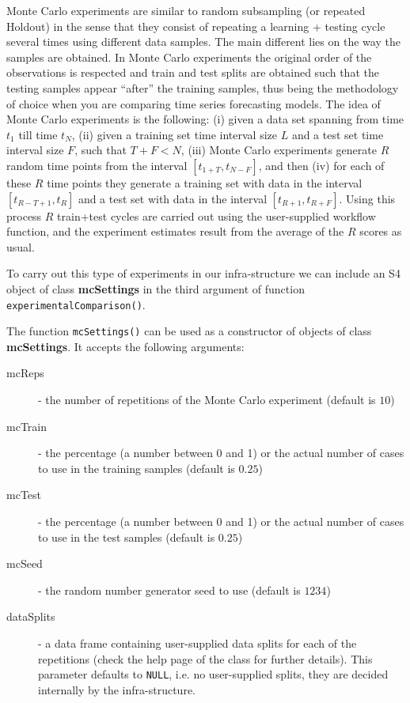 \documentclass[10pt,a4paper]{article}
\begin{document}
Monte Carlo experiments are similar to random subsampling (or repeated
Holdout) in the sense that they consist of repeating a learning +
testing cycle several times using different data samples. The main
different lies on the way the samples are obtained. In Monte Carlo
experiments the original order of the observations is respected and
train and test splits are obtained such that the testing samples
appear ``after'' the training samples, thus being the methodology of
choice when you are comparing time series forecasting models. The idea
of Monte Carlo experiments is the following: (i) given a data set
spanning from time $t_1$ till time $t_N$, (ii) given a training set
time interval size $L$ and a test set time interval size $F$, such
that $T+F < N$, (iii) Monte Carlo experiments generate $R$ random time
points from the interval $[t_{1+T},t_{N-F}]$, and then (iv) for each
of these $R$ time points they generate a training set with data in the
interval $[t_{R-T+1},t_{R}]$ and a test set with data in the interval
$[t_{R+1},t_{R+F}]$. Using this process $R$ train+test cycles are
carried out using the user-supplied workflow function, and the
experiment estimates result from the average of the $R$ scores as
usual.

To carry out this type of experiments in our infra-structure we can
include an S4 object of class \textbf{mcSettings} in the third
argument of function \texttt{experimentalComparison()}.

The function \texttt{mcSettings()} can be used as a constructor of
objects of class \textbf{mcSettings}. It accepts the following
arguments:

\begin{description}
\item[mcReps] - the number of repetitions of the Monte Carlo experiment (default is $10$)
\item[mcTrain] - the percentage (a number between 0 and 1) or the actual number of cases to use in the training samples (default is $0.25$)
\item[mcTest] - the percentage (a number between 0 and 1) or the actual  number of cases to use in the test samples (default is $0.25$)
\item[mcSeed] - the random number generator seed to use (default is $1234$)
\item[dataSplits] - a data frame containing user-supplied data splits
  for each of the repetitions (check the help page of the
  class for further details). This parameter defaults to
  \texttt{NULL}, i.e. no user-supplied splits, they are decided
  internally by the infra-structure.
\end{description}
\end{document}
